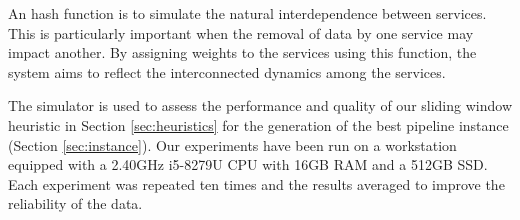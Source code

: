 An hash function is to simulate the natural interdependence between services.
This is particularly important when the removal of data by one service may impact another.
By assigning weights to the services using this function, the system aims to reflect the interconnected dynamics among the services.

The simulator is used to assess the performance and quality of our sliding window heuristic in Section \ref{sec:heuristics} for the generation of the best pipeline instance (Section \ref{sec:instance}).
Our experiments have been run on a workstation equipped with a 2.40GHz i5-8279U CPU with 16GB RAM and a 512GB SSD.
Each experiment was repeated ten times and the results averaged to improve the reliability of the data.

\usetikzlibrary{positioning}
\usetikzlibrary{backgrounds}

